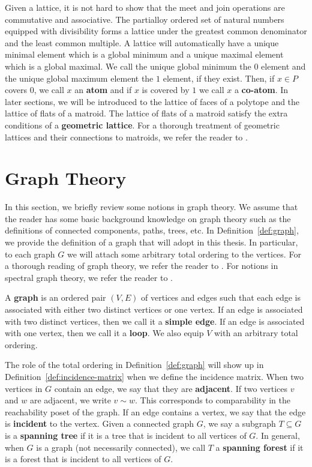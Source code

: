 \documentclass{puthesis-UG}
\begin{document}
Given a lattice, it is not hard to show that the meet and join operations are commutative and associative. The partialloy ordered set of natural numbers equipped with divisibility forms a lattice under the greatest common denominator and the least common multiple. A lattice will automatically have a unique minimal element which is a global minimum and a unique maximal element which is a global maximal. We call the unique global minimum the $0$ element and the unique global maximum element the $1$ element, if they exist. Then, if $x \in P$ covers $0$, we call $x$ an \textbf{atom} and if $x$ is covered by $1$ we call $x$ a \textbf{co-atom}. In later sections, we will be introduced to the lattice of faces of a polytope and the lattice of flats of a matroid. The lattice of flats of a matroid satisfy the extra conditions of a \textbf{geometric lattice}. For a thorough treatment of geometric lattices and their connections to matroids, we refer the reader to \cite{10.5555/1197093}. 

\section{Graph Theory} \label{sec:graph-theory}

In this section, we briefly review some notions in graph theory. We assume that the reader has some basic background knowledge on graph theory such as the definitions of connected components, paths, trees, etc. In Definition~\ref{def:graph}, we provide the definition of a graph that will adopt in this thesis. In particular, to each graph $G$ we will attach some arbitrary total ordering to the vertices. For a thorough reading of graph theory, we refer the reader to \cite{diestel}. For notions in spectral graph theory, we refer the reader to \cite{chung-spectral-graph-theory}. 

\begin{defn} \label{def:graph}
	A \textbf{graph} is an ordered pair $(V, E)$ of vertices and edges such that each edge is associated with either two distinct vertices or one vertex. If an edge is associated with two distinct vertices, then we call it a \textbf{simple edge}. If an edge is associated with one vertex, then we call it a \textbf{loop}. We also equip $V$ with an arbitrary total ordering. 
\end{defn}

The role of the total ordering in Definition~\ref{def:graph} will show up in Definition~\ref{def:incidence-matrix} when we define the incidence matrix. When two vertices in $G$ contain an edge, we say that they are \textbf{adjacent}. If two vertices $v$ and $w$ are adjacent, we write $v \sim w$. This corresponds to comparability in the reachability poset of the graph. If an edge contains a vertex, we say that the edge is \textbf{incident} to the vertex. Given a connected graph $G$, we say a subgraph $T \subseteq G$ is a \textbf{spanning tree} if it is a tree that is incident to all vertices of $G$. In general, when $G$ is a graph (not necessarily connected), we call $T$ a \textbf{spanning forest} if it is a forest that is incident to all vertices of $G$. 
\end{document}
